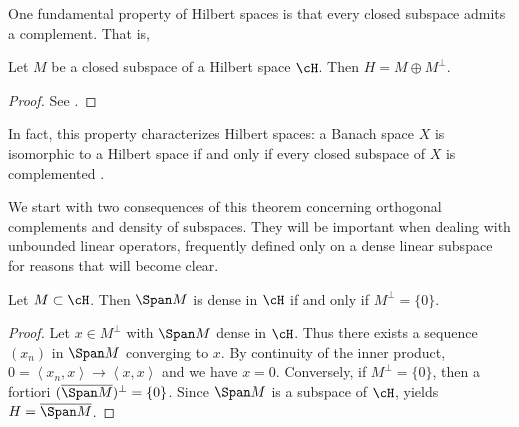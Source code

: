 \documentclass[oneside,reqno,letterpaper]{amsart}
\begin{document}
One fundamental property of Hilbert spaces is that every closed subspace admits a complement. 
That is, 

\begin{theorem}
\label{thm:hilbert-direct-sum}
  Let \(M\) be a closed subspace of a Hilbert space \(\cH\). Then \(H = M \oplus M^\perp\). 
\end{theorem}
\begin{proof}
  See \cite[pp.~137--138, Remark 5]{brezis2011functional}. 
\end{proof}

In fact, this property characterizes Hilbert spaces: a Banach space \(X\) is isomorphic to a Hilbert space if and only if every closed subspace of \(X\) is complemented \cite[p.~39]{brezis2011functional}. 


We start with two consequences of this theorem concerning orthogonal complements and density of subspaces. 
They will be important when dealing with unbounded linear operators, frequently defined only on a dense linear subspace for reasons that will become clear. 


\begin{proposition}
\label{thm:dense-subset-condition}
  Let \(M \subset \cH\). 
  Then \(\Span M\) is dense in \(\cH\) if and only if \(M^\perp = \{0\}\). 
\end{proposition}
\begin{proof}
  Let \(x \in M^{\perp}\) with \(\Span M\) dense in \(\cH\). Thus there exists a sequence \((x_{n})\) in \(\Span M\) converging to \(x\). 
  By continuity of the inner product, \(0 = \left< x_{n}, x \right> \to \left< x, x \right>\) and we have \(x = 0\).
  Conversely, if \(M^{\perp} = \{0\}\), then a fortiori \((\overline{\Span M})^{\perp} = \{0\}\). Since \(\Span M\) is a subspace of \(\cH\),  yields \(H = \overline{\Span M}\). 
\end{proof}
\end{document}
